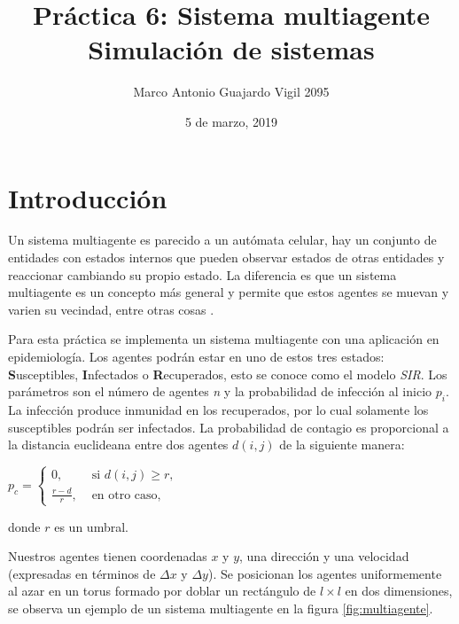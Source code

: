 \documentclass{article}
\author{Marco Antonio Guajardo Vigil  2095}
\title{\textbf{Pr\'actica 6: Sistema multiagente} \\ Simulaci\'on de sistemas}
\date{5 de marzo, 2019}
\begin{document}
\maketitle

\section{Introducci\'on}
Un sistema multiagente es parecido a un aut\'omata celular, hay un conjunto de entidades con estados internos que pueden observar estados de otras entidades y reaccionar cambiando su propio estado. La diferencia es que un sistema multiagente es un concepto m\'as general y permite que estos agentes se muevan y varien su vecindad, entre otras cosas \cite{SatuP6}.

Para esta pr\'actica se implementa un sistema multiagente con una aplicaci\'on en epidemiolog\'ia. Los agentes podr\'an estar en uno de estos tres estados: \textbf{S}usceptibles, \textbf{I}nfectados o \textbf{R}ecuperados, esto se conoce como el modelo \textit{SIR}.
Los par\'ametros son el n\'umero de agentes \textit{n} y la probabilidad de infecci\'on al inicio $p_i$. La infecci\'on produce inmunidad en los recuperados, por lo cual solamente los susceptibles podr\'an ser infectados. La probabilidad de contagio es proporcional a la distancia euclideana entre dos agentes $d(i, j)$ de la siguiente manera:


\begin{center}$p_c = \left \{ \begin{array}{ll}
  0, & \text{ si } d(i, j) \geq r, \\
  \displaystyle\frac{r - d}{r}, & \text{ en otro caso,} \end{array}
  \right.$
\end{center}

donde $r$ es un umbral.

Nuestros agentes tienen coordenadas $x$ y $y$, una direcci\'on y una velocidad (expresadas en t\'erminos de $\Delta x$ y $\Delta y$). Se posicionan los agentes uniformemente al azar en un torus formado por doblar un rect\'angulo de $l \times l$ en dos dimensiones, se observa un ejemplo de un sistema multiagente en la figura \ref{fig:multiagente}.
\end{document}
